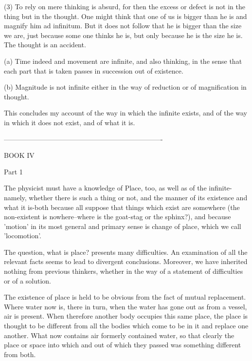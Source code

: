 (3) To rely on mere thinking is absurd, for then the excess or defect
is not in the thing but in the thought. One might think that one of
us is bigger than he is and magnify him ad infinitum. But it does
not follow that he is bigger than the size we are, just because some
one thinks he is, but only because he is the size he is. The thought
is an accident. 

(a) Time indeed and movement are infinite, and also thinking, in the
sense that each part that is taken passes in succession out of existence.

(b) Magnitude is not infinite either in the way of reduction or of
magnification in thought. 

This concludes my account of the way in which the infinite exists,
and of the way in which it does not exist, and of what it is.

----------------------------------------------------------------------

BOOK IV

Part 1 

The physicist must have a knowledge of Place, too, as well as of
the infinite-namely, whether there is such a thing or not, and the
manner of its existence and what it is-both because all suppose that
things which exist are somewhere (the non-existent is nowhere--where
is the goat-stag or the sphinx?), and because 'motion' in its most
general and primary sense is change of place, which we call 'locomotion'.

The question, what is place? presents many difficulties. An examination
of all the relevant facts seems to lead to divergent conclusions.
Moreover, we have inherited nothing from previous thinkers, whether
in the way of a statement of difficulties or of a solution.

The existence of place is held to be obvious from the fact of mutual
replacement. Where water now is, there in turn, when the water has
gone out as from a vessel, air is present. When therefore another
body occupies this same place, the place is thought to be different
from all the bodies which come to be in it and replace one another.
What now contains air formerly contained water, so that clearly the
place or space into which and out of which they passed was something
different from both. 

